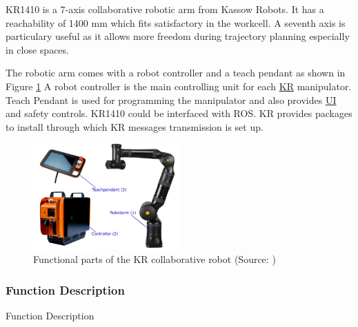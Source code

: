 KR1410 is a 7-axis collaborative robotic arm from Kassow Robots. It has a reachability of 1400 mm which fits
satisfactory in the workcell. A seventh axis is particulary useful as it allows more freedom during trajectory planning
especially in close spaces.

The robotic arm comes with a robot controller and a teach pendant as shown in Figure \ref{fig:kassow-robot-parts} A robot controller is the main controlling unit for each \hyperref[acro:KR]{KR} manipulator.
Teach Pendant is used for programming the manipulator and also provides \hyperref[acro:UI]{UI} and safety controls.
KR1410 could be interfaced with ROS. KR provides packages to install through which KR messages transmission is set up.

\begin{figure}[h]
    \centering
    \includegraphics[width=0.5\textwidth]{figures/kassow-robot-parts.png}
    \caption{Functional parts of the KR collaborative robot (Source: \cite{kassow-manual})}
    \label{fig:kassow-robot-parts}
\end{figure}

\subsubsection{Function Description}
Function Description

